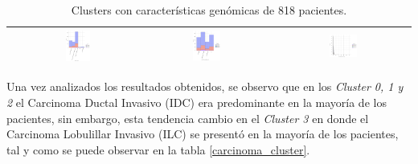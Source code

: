 \begin{table}
\begin{center}
\begin{tabular}{ |c|c|c|c| }
			& \includegraphics[width=0.22\textwidth]{NOTEBOOK/IMAGENES_BIRCH_DESCRIPTIVAS/38} 
			& \includegraphics[width=0.22\textwidth]{NOTEBOOK/IMAGENES_BIRCH_DESCRIPTIVAS/39} 
			& \includegraphics[width=0.22\textwidth]{NOTEBOOK/IMAGENES_BIRCH_DESCRIPTIVAS/40} 
			\\  \hline                  
		\end{tabular} 
		\caption{Clusters con características genómicas de 818 pacientes.}
		\label{clusters}
	\end{center} 
\end{table}
\break
Una vez analizados los resultados obtenidos, se observo que en los \textit {Cluster 0, 1 y 2} el Carcinoma Ductal Invasivo (IDC) era predominante en la mayoría de los pacientes, sin embargo, esta tendencia cambio en el \textit{Cluster 3} en donde el Carcinoma Lobulillar Invasivo (ILC) se presentó en la mayoría de los pacientes, tal y como se puede observar en la tabla \ref{carcinoma_cluster}. 
